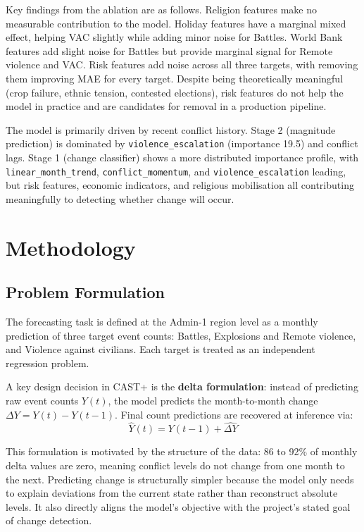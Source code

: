 \documentclass[12pt,a4paper]{article}
\begin{document}
Key findings from the ablation are as follows. Religion features make no
measurable contribution to the model. Holiday features have a marginal
mixed effect, helping VAC slightly while adding minor noise for Battles.
World Bank features add slight noise for Battles but provide marginal
signal for Remote violence and VAC. Risk features add noise across all
three targets, with removing them improving MAE for every target. Despite
being theoretically meaningful (crop failure, ethnic tension, contested
elections), risk features do not help the model in practice and are
candidates for removal in a production pipeline.

The model is primarily driven by recent conflict history. Stage 2
(magnitude prediction) is dominated by \texttt{violence\_escalation}
(importance 19.5) and conflict lags. Stage 1 (change classifier) shows
a more distributed importance profile, with \texttt{linear\_month\_trend},
\texttt{conflict\_momentum}, and \texttt{violence\_escalation} leading,
but risk features, economic indicators, and religious mobilisation all
contributing meaningfully to detecting whether change will occur.


\section{Methodology}

\subsection{Problem Formulation}

The forecasting task is defined at the Admin-1 region level as a monthly
prediction of three target event counts: Battles, Explosions and Remote
violence, and Violence against civilians. Each target is treated as an
independent regression problem.

A key design decision in CAST+ is the \textbf{delta formulation}: instead
of predicting raw event counts $Y(t)$, the model predicts the
month-to-month change $\Delta Y = Y(t) - Y(t-1)$. Final count predictions
are recovered at inference via:
\[
    \hat{Y}(t) = Y(t-1) + \hat{\Delta Y}
\]

This formulation is motivated by the structure of the data: 86 to 92\%
of monthly delta values are zero, meaning conflict levels do not change
from one month to the next. Predicting change is structurally simpler
because the model only needs to explain deviations from the current
state rather than reconstruct absolute levels. It also directly aligns
the model's objective with the project's stated goal of change detection.
\end{document}
